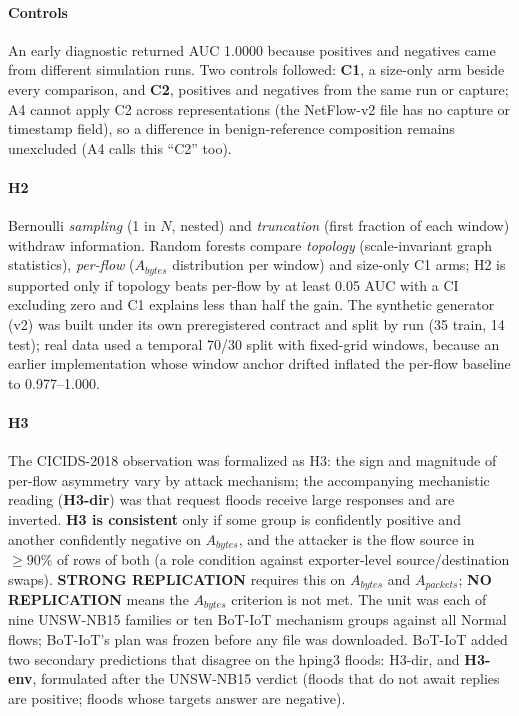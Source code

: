 \documentclass[preprint,12pt]{elsarticle}
\begin{document}
\paragraph{Controls} An early diagnostic returned AUC 1.0000 because positives and negatives came from different simulation runs. Two controls followed: \textbf{C1}, a size-only arm beside every comparison, and \textbf{C2}, positives and negatives from the same run or capture; A4 cannot apply C2 across representations (the NetFlow-v2 file has no capture or timestamp field), so a difference in benign-reference composition remains unexcluded (A4 calls this ``C2'' too).

\paragraph{H2} Bernoulli \emph{sampling} (1 in $N$, nested) and \emph{truncation} (first fraction of each window) withdraw information. Random forests compare \emph{topology} (scale-invariant graph statistics), \emph{per-flow} ($A_{bytes}$ distribution per window) and size-only C1 arms; H2 is supported only if topology beats per-flow by at least 0.05 AUC with a CI excluding zero and C1 explains less than half the gain. The synthetic generator (v2) was built under its own preregistered contract and split by run (35 train, 14 test); real data used a temporal 70/30 split with fixed-grid windows, because an earlier implementation whose window anchor drifted inflated the per-flow baseline to 0.977--1.000.

\paragraph{H3} The CICIDS-2018 observation was formalized as H3: the sign and magnitude of per-flow asymmetry vary by attack mechanism; the accompanying mechanistic reading (\textbf{H3-dir}) was that request floods receive large responses and are inverted. \textbf{H3 is consistent} only if some group is confidently positive and another confidently negative on $A_{bytes}$, and the attacker is the flow source in $\ge90\%$ of rows of both (a role condition against exporter-level source/destination swaps). \textbf{STRONG REPLICATION} requires this on $A_{bytes}$ and $A_{packets}$; \textbf{NO REPLICATION} means the $A_{bytes}$ criterion is not met. The unit was each of nine UNSW-NB15 families or ten BoT-IoT mechanism groups against all Normal flows; BoT-IoT's plan was frozen before any file was downloaded. BoT-IoT added two secondary predictions that disagree on the hping3 floods: H3-dir, and \textbf{H3-env}, formulated after the UNSW-NB15 verdict (floods that do not await replies are positive; floods whose targets answer are negative).
\end{document}
